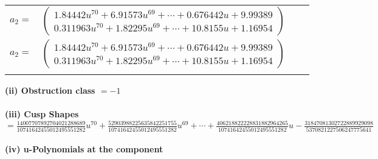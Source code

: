 \documentclass[1p]{elsarticle_modified}
\theoremstyle{definition}
\begin{document}
\begin{tabular}{m{7pt} m{180pt} m{7pt} m{180pt} }
\flushright $a_{2}=$&$\begin{pmatrix}1.84442 u^{70}+6.91573 u^{69}+\cdots+0.676442 u+9.99389\\0.311963 u^{70}+1.82295 u^{69}+\cdots+10.8155 u+1.16954\end{pmatrix}$\\ \flushright $a_{2}=$&$\begin{pmatrix}1.84442 u^{70}+6.91573 u^{69}+\cdots+0.676442 u+9.99389\\0.311963 u^{70}+1.82295 u^{69}+\cdots+10.8155 u+1.16954\end{pmatrix}$\\&\end{tabular}
\flushleft \textbf{(ii) Obstruction class $= -1$}\\~\\
\flushleft \textbf{(iii) Cusp Shapes $= \frac{14007707892704021288689}{10741642455012495551282} u^{70}+\frac{52903988225635842251755}{10741642455012495551282} u^{69}+\cdots+\frac{406218822228831882964265}{10741642455012495551282} u-\frac{31847081302722889929098}{5370821227506247775641}$}\\~\\
\newpage\renewcommand{\arraystretch}{1}
\flushleft \textbf{(iv) u-Polynomials at the component}\newline \\
\end{document}
